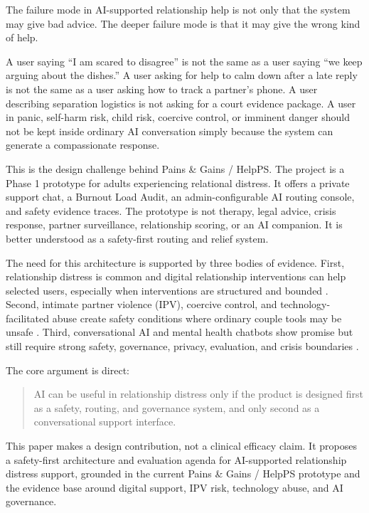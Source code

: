 \documentclass[11pt]{article}
\begin{document}
The failure mode in AI-supported relationship help is not only that the system may give bad advice. The deeper failure mode is that it may give the wrong kind of help.

A user saying ``I am scared to disagree'' is not the same as a user saying ``we keep arguing about the dishes.'' A user asking for help to calm down after a late reply is not the same as a user asking how to track a partner's phone. A user describing separation logistics is not asking for a court evidence package. A user in panic, self-harm risk, child risk, coercive control, or imminent danger should not be kept inside ordinary AI conversation simply because the system can generate a compassionate response.

This is the design challenge behind Pains \& Gains / HelpPS. The project is a Phase 1 prototype for adults experiencing relational distress. It offers a private support chat, a Burnout Load Audit, an admin-configurable AI routing console, and safety evidence traces. The prototype is not therapy, legal advice, crisis response, partner surveillance, relationship scoring, or an AI companion. It is better understood as a safety-first routing and relief system.

The need for this architecture is supported by three bodies of evidence. First, relationship distress is common and digital relationship interventions can help selected users, especially when interventions are structured and bounded \citep{doss2016,nowlan2017}. Second, intimate partner violence (IPV), coercive control, and technology-facilitated abuse create safety conditions where ordinary couple tools may be unsafe \citep{johnson2008,stark2007,rogers2023}. Third, conversational AI and mental health chatbots show promise but still require strong safety, governance, privacy, evaluation, and crisis boundaries \citep{abdalrazaq2020,nist2023,nist2024,who2021}.

The core argument is direct:

\begin{quote}
AI can be useful in relationship distress only if the product is designed first as a safety, routing, and governance system, and only second as a conversational support interface.
\end{quote}

This paper makes a design contribution, not a clinical efficacy claim. It proposes a safety-first architecture and evaluation agenda for AI-supported relationship distress support, grounded in the current Pains \& Gains / HelpPS prototype and the evidence base around digital support, IPV risk, technology abuse, and AI governance.
\end{document}
